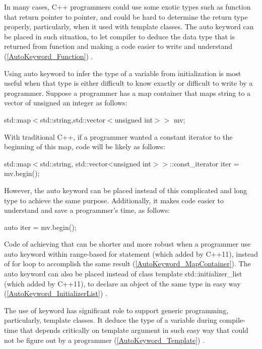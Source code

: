 \documentclass[11pt]{report}
\begin{document}
In many cases, C++ programmers could use some exotic types such as function that return pointer to pointer, and could be hard to determine the return type properly, particularly, when it used with template classes. The auto keyword can be placed in such situation, to let compiler to deduce the data type that is returned from function and making a code easier to write and understand (\ref{AutoKeyword_Function}) \cite{Overland:2011:CWF}.


Using auto keyword to infer the type of a variable from initialization is most useful when that type is either difficult to know exactly or difficult to write by a programmer. Suppose a programmer has a map container that maps string to a vector of unsigned an integer as follows: 

\begin{center}
std::map$<$std::string,std::vector$<$unsigned int$>>$ mv;
\end{center}

With traditional C++, if a programmer wanted a constant iterator to the beginning of this map, code will be likely as follows:

\begin{center}
std::map$<$std::string, std::vector<unsigned int$>>$::const\_iterator iter = mv.begin();
\end{center}

However, the auto keyword can be placed instead of this complicated and long type to achieve the same purpose. Additionally, it makes code easier to understand and save a programmer's time, as follows:

\begin{center}
auto iter = mv.begin();
\end{center}

Code of achieving that can be shorter and more robust when a programmer use auto keyword within range-based for statement (which added by C++11), instead of for loop to accomplish the same result (\ref{AutoKeyword_MapContainer}). The auto keyword can also be placed instead of class template std::initializer\_list (which added by C++11), to declare an object of the same type in easy way (\ref{AutoKeyword_InitializerList}) \cite{Gregorie:professionalcpp}.


The use of keyword has significant role to support generic programming, particularly, template classes. It deduce the type of a variable  during compile- time that depends critically on template argument in such easy way that could not be figure out by a programmer (\ref{AutoKeyword_Template}) \cite{Stroustrup:2012:Cpp11}.
\end{document}

